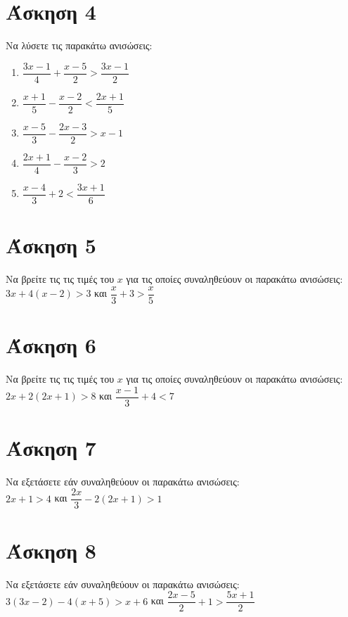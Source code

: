 \documentclass[a4paper,10pt]{report}
\begin{document}
\section*{Άσκηση 4  \hfill \small{}}
Να λύσετε τις παρακάτω ανισώσεις:
\begin{enumerate}[1)]
\item $\dfrac{3x-1}{4}+\dfrac{x-5}{2}>\dfrac{3x-1}{2}$
\item $\dfrac{x+1}{5}-\dfrac{x-2}{2}<\dfrac{2x+1}{5}$
\item $\dfrac{x-5}{3}-\dfrac{2x-3}{2}>x-1$
\item $\dfrac{2x+1}{4}-\dfrac{x-2}{3}>2$
\item $\dfrac{x-4}{3}+2<\dfrac{3x+1}{6}$
\end{enumerate}

\section*{Άσκηση 5  \hfill \small{}}
Να βρείτε τις τις τιμές του $x$ για τις οποίες συναληθεύουν οι παρακάτω ανισώσεις: \\
$3x+4(x-2)>3$ και $\dfrac{x}{3}+3>\dfrac{x}{5}$

\section*{Άσκηση 6  \hfill \small{}}
Να βρείτε τις τις τιμές του $x$ για τις οποίες συναληθεύουν οι παρακάτω ανισώσεις: \\
$2x+2(2x+1)>8$ και $\dfrac{x-1}{3}+4<7$

\section*{Άσκηση 7  \hfill \small{}}
Να εξετάσετε εάν συναληθεύουν οι παρακάτω ανισώσεις: \\
$2x+1>4$ και $\dfrac{2x}{3}-2(2x+1)>1$

\section*{Άσκηση 8  \hfill \small{}}
Να εξετάσετε εάν συναληθεύουν οι παρακάτω ανισώσεις: \\
$3(3x-2)-4(x+5)>x+6$ και $\dfrac{2x-5}{2}+1>\dfrac{5x+1}{2}$
\end{document}

